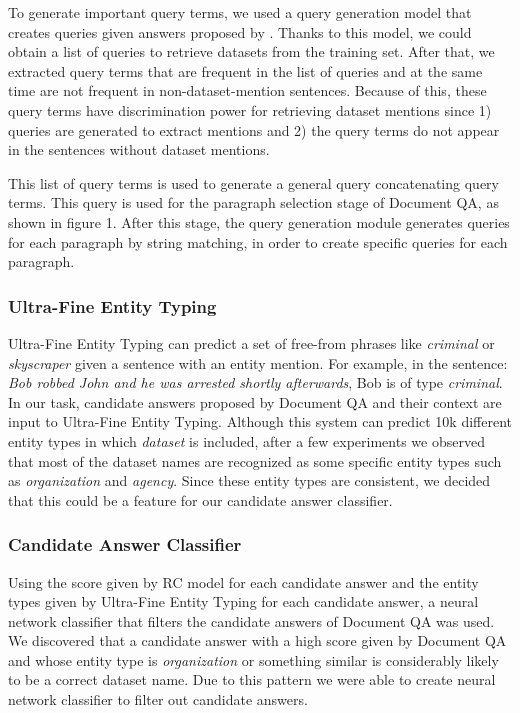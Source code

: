 \documentclass[11pt]{article}
\begin{document}
To generate important query terms, we used a query generation model that creates queries given answers proposed by \cite{yuan2017machine}. Thanks to this model, we could obtain a list of queries to retrieve datasets from the training set. After that, we extracted query terms that are frequent in the list of queries and at the same time are not frequent in non-dataset-mention sentences. Because of this, these query terms have discrimination power for retrieving dataset mentions since 1) queries are generated to extract mentions and 2) the query terms do not appear in the sentences without dataset mentions.

This list of query terms is used to generate a general query concatenating query terms. This query is used for the paragraph selection stage of Document QA, as shown in figure 1. After this stage, the query generation module generates queries for each paragraph by string matching, in order to create specific queries for each paragraph.

\subsubsection{Ultra-Fine Entity Typing}
Ultra-Fine Entity Typing \cite{Choi:2018:ACL} can predict a set of free-from phrases like \textit{criminal} or \textit{skyscraper} given a sentence with an entity mention. For example, in the sentence: \textit{Bob robbed John and he was arrested shortly afterwards}, Bob is of type \textit{criminal}. In our task, candidate answers proposed by Document QA and their context are input to Ultra-Fine Entity Typing.
Although this system can predict 10k different entity types in which \textit{dataset} is included, after a few experiments we observed that most of the dataset names are recognized as some specific entity types such as \textit{organization} and \textit{agency}. Since these entity types are consistent, we decided that this could be a feature for our candidate answer classifier.

\subsubsection{Candidate Answer Classifier}
Using the score given by RC model for each candidate answer and the entity types given by Ultra-Fine Entity Typing for each candidate answer, a neural network classifier that filters the candidate answers of Document QA was used. We discovered that a candidate answer with a high score given by Document QA and whose entity type is \textit{organization} or something similar is considerably likely to be a correct dataset name. Due to this pattern we were able to create neural network classifier to filter out candidate answers.
\end{document}
